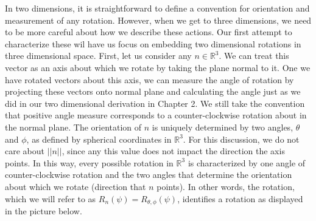 \documentclass[10pt]{ucthesis}
\newcommand{\R}{\mathbb{R}}
\begin{document}
In two dimensions, it is straightforward to define a convention for orientation and measurement of any rotation. However, when we get to three dimensions, we need to be more careful about how we describe these actions. Our first attempt to characterize these wil have us focus on embedding two dimensional rotations in three dimensional space. First, let us consider any $n\in\R^3$. We can treat this vector as an axis about which we rotate by taking the plane normal to it. One we have rotated vectors about this axis, we can measure the angle of rotation by projecting these vectors onto normal plane and calculating the angle just as we did in our two dimensional derivation in Chapter 2. We still take the convention that positive angle measure corresponds to a counter-clockwise rotation about in the normal plane. The orientation of $n$ is uniquely determined by two angles, $\theta$ and $\phi$, as defined by spherical coordinates in $\R^3$. For this discussion, we do not care about $||n||$, since any this value does not impact the direction the axis points. In this way, every possible rotation in $\R^3$ is characterized by one angle of counter-clockwise rotation and the two angles that determine the orientation about which we rotate (direction that $n$ points). In other words, the rotation, which we will refer to as $R_n(\psi) = R_{\theta,\phi}(\psi)$, identifies a rotation as displayed in the picture below.

\begin{center}
\end{center}
\end{document}
